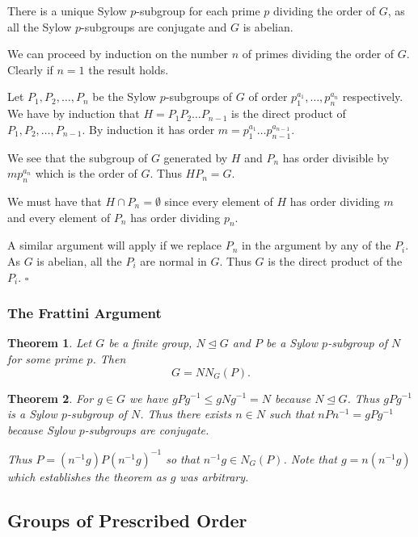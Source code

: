 \documentclass[10pt]{article}
\newtheorem{theorem}{Theorem}[section]
\newenvironment{proof}[1][Proof]{\begin{trivlist}
\item[\hskip \labelsep {\itshape #1}]}{\end{trivlist}}
\begin{document}
\begin{proof}
There is a unique Sylow $p$-subgroup for each prime $p$ dividing the order of $G$, as all the Sylow $p$-subgroups are conjugate and $G$ is abelian.

We can proceed by induction on the number $n$ of primes dividing the order of $G$. Clearly if $n = 1$ the result holds.

Let $P_1, P_2, \ldots, P_n$ be the Sylow $p$-subgroups of $G$ of order $p_1^{a_1}, \ldots, p_n^{a_n}$ respectively. We have by induction that $H = P_1P_2\ldots P_{n-1}$ is the direct product of $P_1, P_2, \ldots, P_{n-1}$. By induction it has order $m = p_1^{a_1}\ldots p_{n-1}^{a_{n-1}}$.

We see that the subgroup of $G$ generated by $H$ and $P_n$ has order divisible by $mp_n^{a_n}$ which is the order of $G$. Thus $HP_n = G$.

We must have that $H\cap P_n = \emptyset$ since every element of $H$ has order dividing $m$ and every element of $P_n$ has order dividing $p_n$.

A similar argument will apply if we replace $P_n$ in the argument by any of the $P_i$. As $G$ is abelian, all the $P_i$ are normal in $G$. Thus $G$ is the direct product of the $P_i$. $\square$
\end{proof}

\subsubsection{The Frattini Argument}

\begin{theorem}
Let $G$ be a finite group, $N \mathrel{\unlhd} G$ and $P$ be a Sylow $p$-subgroup of $N$ for some prime $p$. Then
$$G = NN_G(P).$$ 
\end{theorem}

\begin{theorem}
For $g \in G$ we have $gPg^{-1} \leq gNg^{-1} = N$ because $N \mathrel{\unlhd} G$. Thus $gPg^{-1}$ is a Sylow $p$-subgroup of $N$. Thus there exists $n \in N$ such that $nPn^{-1} = gPg^{-1}$ because Sylow $p$-subgroups are conjugate.

Thus $P = (n^{-1}g)P(n^{-1}g)^{-1}$ so that $n^{-1}g \in N_G(P)$. Note that $g = n(n^{-1}g)$ which establishes the theorem as $g$ was arbitrary.
\end{theorem}

\subsection{Groups of Prescribed Order}
\end{document}
